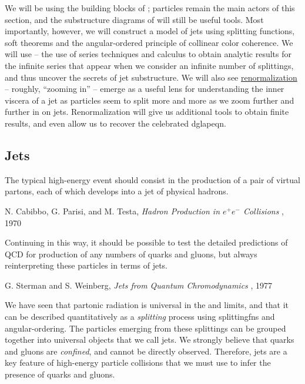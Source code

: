 We will be using the building blocks of ;
%
particles remain the main actors of this section, and the substructure diagrams of  will still be useful tools.
%
Most importantly, however, we will construct a model of jets using splitting functions, soft theorems and the angular-ordered principle of collinear color coherence.
%
We will use  -- the use of series techniques and calculus to obtain analytic results for the infinite series that appear when we consider an infinite number of splittings, and thus uncover the secrets of jet substructure.
%
We will also see \underline{renormalization} -- roughly, ``zooming in'' -- emerge as a useful lens for understanding the inner viscera of a jet as particles seem to split more and more as we zoom further and further in on jets.
%
Renormalization will give us additional tools to obtain finite results, and even allow us to recover the celebrated \gls{dglapeqn}.





\subsection{Jets}
\label{sec:jet-intro}

\epigraph{The typical high-energy event should consist in the production of a pair of virtual partons, each of which develops into a jet of physical hadrons.}{N. Cabibbo, G. Parisi, and M. Testa, \textit{Hadron Production in \(e^+ e^-\) Collisions} \cite{Cabibbo:1970mh}, 1970}

\epigraph{Continuing in this way, it should be possible to test the detailed predictions of QCD for production of any numbers of quarks and gluons, but always reinterpreting
these particles in terms of jets.}{G. Sterman and S. Weinberg, \textit{Jets from Quantum Chromodynamics} \cite{Sterman:1977wj}, 1977}


We have seen that partonic radiation is universal in the  and  limits, and that it can be described quantitatively as a \textit{splitting} process using \glspl{splittingfn} and \gls{angular-ordering}.
%
The particles emerging from these splittings can be grouped together into universal objects that we call jets.
%
We strongly believe that quarks and gluons are \textit{confined}, and cannot be directly observed.
%
Therefore, jets are a key feature of high-energy particle collisions that we must use to infer the presence of quarks and gluons.

